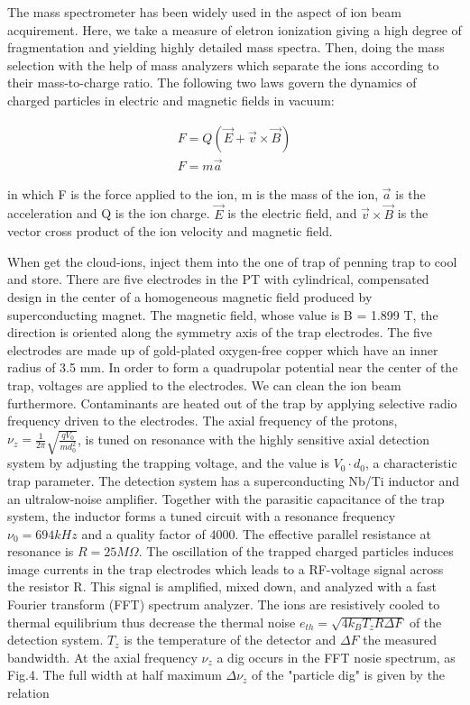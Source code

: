 The mass spectrometer has been widely used in the aspect of ion beam acquirement. Here, we take a measure of eletron ionization giving a high degree of fragmentation and yielding highly detailed mass spectra. Then, doing the mass selection with the help of mass analyzers which separate the ions according to their mass-to-charge ratio. The following two laws govern the dynamics of charged particles in electric and magnetic fields in vacuum:

\begin{align*}
F=Q(\vec{E}+\vec{v} \times \vec{B})\\
F=m\vec{a}
\end{align*}

in which F is the force applied to the ion, m is the mass of the ion, $\vec{a}$ is the acceleration and Q is the ion charge. $\vec{E}$ is the electric field, and $\vec{v}\times\vec{B}$ is the vector cross product of the ion velocity and magnetic field.

When get the cloud-ions, inject them into the one of trap of penning trap to cool and store. There are five electrodes in the PT with cylindrical, compensated design\cite{GABRIELSE1989319}\cite{1367-2630-10-10-103009} in the center of a homogeneous magnetic field produced by superconducting magnet. The magnetic field, whose value is B = 1.899 T, the direction is oriented along the symmetry axis of the trap electrodes. The five electrodes are made up of gold-plated oxygen-free copper which have an inner radius of 3.5 mm. In order to form a quadrupolar potential near the center of the trap, voltages are applied to the electrodes. We can clean the ion beam furthermore. Contaminants are heated out of the trap by applying selective radio frequency driven to the electrodes. The axial frequency of the protons, $\nu_z=\frac{1}{2\pi}\sqrt{\frac{qV_0}{md_0^2}}$, is tuned on resonance with the highly sensitive axial detection system by adjusting the trapping voltage, and the value is $V_0\cdot d_0$, a characteristic trap parameter. The detection system has a superconducting Nb/Ti inductor and an ultralow-noise amplifier. Together with the parasitic capacitance of the trap system, the inductor forms a tuned circuit with a resonance frequency $\nu_0 = 694kHz$ and a quality factor of 4000. The effective parallel resistance at resonance is $R = 25M\Omega$. The oscillation of the trapped charged particles induces image currents in the trap electrodes which leads to a RF-voltage signal across the resistor R. This signal is amplified, mixed down, and analyzed with a fast Fourier transform (FFT) spectrum analyzer. The ions are resistively cooled to thermal equilibrium thus decrease the thermal noise $e_{th}=\sqrt{4k_BT_zR\Delta F}$ of the detection system. $T_z$ is the temperature of the detector and $\Delta F$ the measured bandwidth. At the axial frequency $\nu_z$ a dig occurs in the FFT nosie spectrum, as Fig.4. The full width at half maximum $\Delta\nu_z$ of the "particle dig" is given by the relation 

